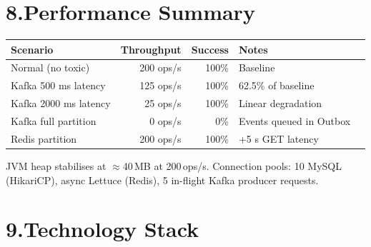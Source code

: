 \documentclass[11pt,a4paper]{article}
\begin{document}
\section*{8.\quad Performance Summary}

\begin{center}
\small
\begin{tabular}{@{}lrrll@{}}
\toprule
\textbf{Scenario} & \textbf{Throughput} & \textbf{Success} & \textbf{Notes} \\
\midrule
Normal (no toxic)       & 200 ops/s & 100\% & Baseline \\
Kafka 500 ms latency    & 125 ops/s & 100\% & 62.5\% of baseline \\
Kafka 2000 ms latency   &  25 ops/s & 100\% & Linear degradation \\
Kafka full partition     &   0 ops/s &   0\% & Events queued in Outbox \\
Redis partition          & 200 ops/s & 100\% & +5 s GET latency \\
\bottomrule
\end{tabular}
\end{center}

\noindent JVM heap stabilises at $\approx$40\,MB at 200\,ops/s.
Connection pools: 10 MySQL (HikariCP), async Lettuce (Redis),
5 in-flight Kafka producer requests.

\section*{9.\quad Technology Stack}
\end{document}
